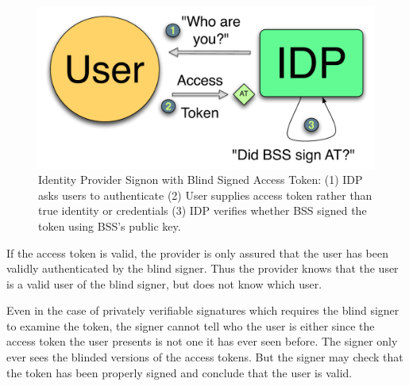 \documentclass{llncs}
\begin{document}
\begin{figure}
  \centering
  \includegraphics[scale=0.6]{figs/fig-bss-signon-color.pdf}
  \caption{Identity Provider Signon with Blind Signed Access Token: (1) IDP asks
  users to authenticate (2) User supplies access token rather than true identity
  or credentials (3) IDP verifies whether BSS signed the token using BSS's
  public key.}
  \label{fig:bss-signon}
\end{figure}

If the access token is valid, the provider is only assured that the user has
been validly authenticated by the blind signer. Thus the provider knows that the
user is a valid user of the blind signer, but does not know which user.

Even in the case of privately verifiable signatures which requires the blind
signer to examine the token, the signer cannot tell who the user is either since
the access token the user presents is not one it has ever seen before. The
signer only ever sees the blinded versions of the access tokens. But the signer
may check that the token has been properly signed and conclude that the user is
valid.
\end{document}
